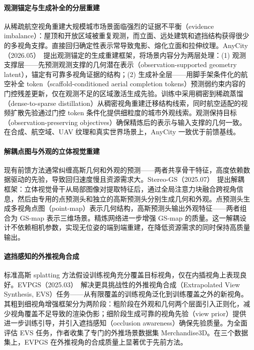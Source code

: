 \paragraph{观测锚定与生成补全的分层重建}

从稀疏航空视角重建大规模城市场景面临强烈的证据不平衡（evidence imbalance）：屋顶和开放区域被重复观测，而立面、远处建筑和遮挡结构获得很少的多视角支撑。直接回归确定性表示常导致鬼影、熔化立面和拉伸纹理。AnyCity（2026.05）~\cite{2605_19949}提出观测锚定的生成重建框架，将场景内容分为两层处理：(1) 观测支撑层——先预测观测支撑的几何潜在表示（observation-supported geometry latent），锚定有可靠多视角证据的结构；(2) 生成补全层——用脚手架条件化的航空补全 token（scaffold-conditioned aerial completion tokens）预测弱约束内容的门控残差更新，仅在观测不足的区域激活生成先验。训练中采用稠密到稀疏蒸馏（dense-to-sparse distillation）从稠密视角重建迁移结构线索，同时航空适配的视频扩散先验通过门控 token 条件化提供细粒度的城市外观线索。观测保持目标（observation-preserving objectives）确保精炼后的表示与输入支撑的几何一致。在合成、航空域、UAV 纹理和真实世界场景上，AnyCity 一致优于前馈基线。

\paragraph{解耦点图与外观的立体视觉重建}

现有前馈方法通常纠缠高斯几何和外观的预测——两者共享骨干特征，高度依赖数据驱动的先验，导致回归速度慢且资源需求大。Stereo-GS（2025.07）~\cite{2507_14921}提出解耦框架：立体视觉骨干从局部图像对提取特征后，通过全局注意力块融合跨视角信息，然后由专用的点预测头和独立的高斯预测头分别生成几何和外观。点预测头生成多视角点图（point-map）表示几何结构，高斯预测头输出外观特征——两者组合为 GS-map 表示三维场景。精炼网络进一步增强 GS-map 的质量。这一解耦设计不依赖相机参数，实现无位姿的端到端重建，在降低资源需求的同时保持高质量输出。

\paragraph{遮挡感知的外推视角合成}

标准高斯 splatting 方法假设训练视角充分覆盖目标视角，仅在内插视角上表现良好。EVPGS（2025.03）~\cite{2503_21816}解决更具挑战性的外推视角合成（Extrapolated View Synthesis, EVS）任务——从有限覆盖的训练视角泛化到训练覆盖之外的新视角。其粗到细视角增强框架分为两阶段：粗阶段在外观和几何两个层面引入正则化，减少视角覆盖不足导致的渲染伪影；细阶段生成可靠的视角先验（view prior）提供进一步训练引导，并引入遮挡感知（occlusion awareness）确保先验质量。为全面评估 EVS 任务，作者收集了专门的外推场景数据集 Merchandise3D。在三个数据集上，EVPGS 在外推视角的合成质量上显著优于先前方法。

